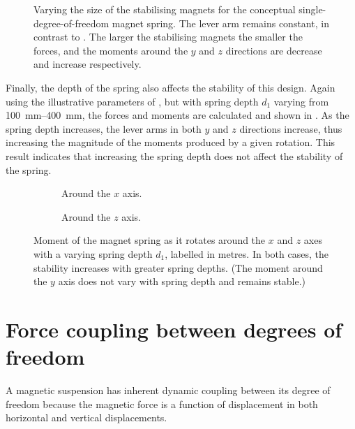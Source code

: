 \begin{figure}
  \caption{
    Varying the size of the stabilising magnets for the conceptual single-degree-of-freedom magnet spring.
    The lever arm remains constant, in contrast to .
    The larger the stabilising magnets the smaller the forces, and the moments around the $y$ and $z$ directions are decrease and increase respectively.
  }
\end{figure}

Finally, the depth of the spring also affects the stability of this design.
Again using the illustrative parameters of , but with spring depth $d_1$ varying from \SIrange{100}{400}{mm}, the forces and moments are calculated and shown in .
As the spring depth increases, the lever arms in both $y$ and $z$ directions increase, thus increasing the magnitude of the moments produced by a given rotation.
This result indicates that increasing the spring depth does not affect the stability of the spring.

\begin{figure}
  \begin{wide}
    \begin{subfigure}
      \caption{Around the $x$ axis.}
    \end{subfigure}
    \hfil
    \begin{subfigure}
      \caption{Around the $z$ axis.}
    \end{subfigure}
  \end{wide}
  \caption{
    Moment of the magnet spring as it rotates around the $x$ and $z$ axes with a varying spring depth $d_1$, labelled in metres.
    In both cases, the stability increases with greater spring depths.
    (The moment around the $y$ axis does not vary with spring depth and remains stable.)
  }
\end{figure}

\section{Force coupling between degrees of freedom}

A magnetic suspension has inherent dynamic coupling between its degree of
freedom because the magnetic force is a function of displacement in both
horizontal and vertical displacements.

